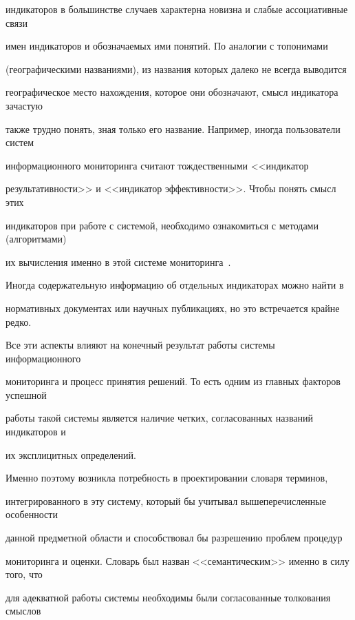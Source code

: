 индикаторов в большинстве случаев характерна новизна и слабые ассоциативные связи 


имен индикаторов и обозначаемых ими понятий. По аналогии с топонимами 


(географическими названиями), из названия которых далеко не всегда выводится 


географическое место нахождения, которое они обозначают, смысл индикатора зачастую 


также трудно понять, зная только его название. Например, иногда пользователи систем 


информационного мониторинга считают тождественными <<индикатор 


результативности>> и <<индикатор эффективности>>. Чтобы понять смысл этих 


индикаторов при работе с системой, необходимо ознакомиться с методами (алгоритмами) 


их вычисления именно в этой системе мониторинга~\cite{49-2-11}.


   


   Иногда содержательную информацию об отдельных индикаторах можно \mbox{найти} в 


нормативных документах или научных публикациях, но это встречается крайне редко. 


   


   Все эти аспекты влияют на конечный результат работы системы информационного 


мониторинга и процесс принятия решений. То есть одним из главных факторов успешной 


работы такой системы является наличие четких, согласованных названий индикаторов и 


их эксплицитных определений. 


   


   Именно поэтому возникла потребность в проектировании словаря терминов, 


интегрированного в эту систему, который бы учитывал вышеперечисленные особенности 


данной предметной области и способствовал бы разрешению проблем процедур 


мониторинга и оценки. Словарь был назван <<семантическим>> именно в силу того, что 


для адекватной работы системы необходимы были согласованные толкования смыслов 


